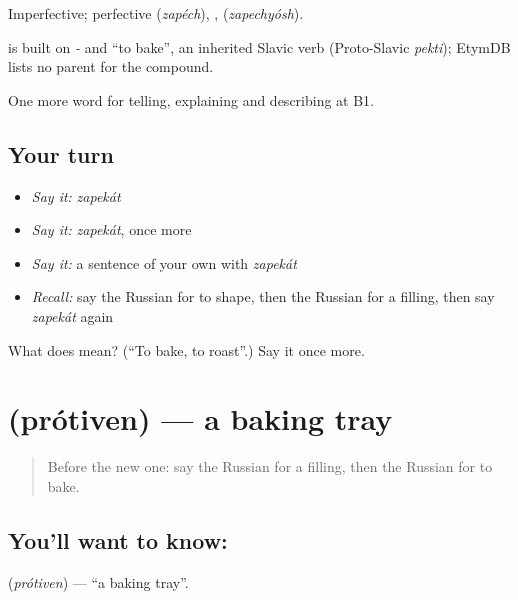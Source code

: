Imperfective; perfective \emph{} (\emph{zapéch}), \emph{}, \emph{} (\emph{zapechyósh}).

\begin{cousinweb}
\emph{} is built on \emph{-} and \emph{} \textquotedblleft{}to bake\textquotedblright{}, an inherited Slavic verb (Proto-Slavic \emph{pekti}); EtymDB lists no parent for the compound.
\end{cousinweb}

\begin{grammarlens}[title={What you've built}]
One more word for telling, explaining and describing at B1.
\end{grammarlens}

\subsection*{Your turn}
\begin{itemize}
\raggedright
  \item \emph{Say it:} \emph{zapekát}
  \item \emph{Say it:} \emph{zapekát}, once more
  \item \emph{Say it:} a sentence of your own with \emph{zapekát}
  \item \emph{Recall:} say the Russian for to shape, then the Russian for a filling, then say \emph{zapekát} again
\end{itemize}

\begin{tcolorbox}[breakable,colback=teal!4,colframe=teal!35!black,title={Before you move on}]
What does  mean? (\textquotedblleft{}To bake, to roast\textquotedblright{}.) Say it once more.
\end{tcolorbox}
\section[\texorpdfstring{\ru{противень} (prótiven)}{противень (prótiven)}]{ (prótiven) — a baking tray}

\label{lesson:RU-C332-protiven}



\begin{quote}
Before the new one: say the Russian for a filling, then the Russian for to bake.
\end{quote}

\subsection*{You'll want to know: }
\textbf{} (\emph{prótiven}) — \textquotedblleft{}a baking tray\textquotedblright{}.

